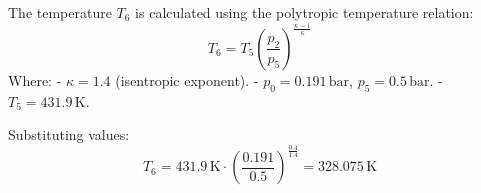 The temperature \( T_6 \) is calculated using the polytropic temperature relation:  
\[
T_6 = T_5 \left( \frac{p_2}{p_5} \right)^{\frac{\kappa - 1}{\kappa}}
\]  
Where:  
- \( \kappa = 1.4 \) (isentropic exponent).  
- \( p_0 = 0.191 \, \text{bar} \), \( p_5 = 0.5 \, \text{bar} \).  
- \( T_5 = 431.9 \, \text{K} \).  

Substituting values:  
\[
T_6 = 431.9 \, \text{K} \cdot \left( \frac{0.191}{0.5} \right)^{\frac{0.4}{1.4}} = 328.075 \, \text{K}
\]